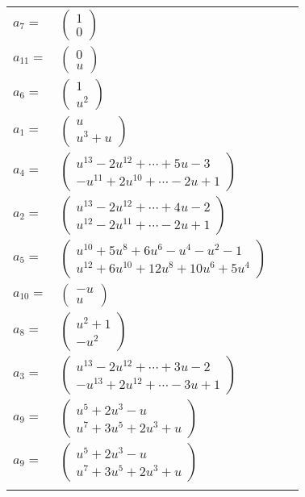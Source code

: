 \documentclass[1p]{elsarticle_modified}
\theoremstyle{definition}
\begin{document}
\begin{tabular}{m{7pt} m{180pt} m{7pt} m{180pt} }
\flushright $a_{7}=$&$\begin{pmatrix}1\\0\end{pmatrix}$ \\
\flushright $a_{11}=$&$\begin{pmatrix}0\\u\end{pmatrix}$ \\
\flushright $a_{6}=$&$\begin{pmatrix}1\\u^2\end{pmatrix}$ \\
\flushright $a_{1}=$&$\begin{pmatrix}u\\u^3+u\end{pmatrix}$ \\
\flushright $a_{4}=$&$\begin{pmatrix}u^{13}-2 u^{12}+\cdots+5 u-3\\- u^{11}+2 u^{10}+\cdots-2 u+1\end{pmatrix}$ \\
\flushright $a_{2}=$&$\begin{pmatrix}u^{13}-2 u^{12}+\cdots+4 u-2\\u^{12}-2 u^{11}+\cdots-2 u+1\end{pmatrix}$ \\
\flushright $a_{5}=$&$\begin{pmatrix}u^{10}+5 u^8+6 u^6- u^4- u^2-1\\u^{12}+6 u^{10}+12 u^8+10 u^6+5 u^4\end{pmatrix}$ \\
\flushright $a_{10}=$&$\begin{pmatrix}- u\\u\end{pmatrix}$ \\
\flushright $a_{8}=$&$\begin{pmatrix}u^2+1\\- u^2\end{pmatrix}$ \\
\flushright $a_{3}=$&$\begin{pmatrix}u^{13}-2 u^{12}+\cdots+3 u-2\\- u^{13}+2 u^{12}+\cdots-3 u+1\end{pmatrix}$ \\
\flushright $a_{9}=$&$\begin{pmatrix}u^5+2 u^3- u\\u^7+3 u^5+2 u^3+u\end{pmatrix}$\\ \flushright $a_{9}=$&$\begin{pmatrix}u^5+2 u^3- u\\u^7+3 u^5+2 u^3+u\end{pmatrix}$\\&\end{tabular}
\end{document}
